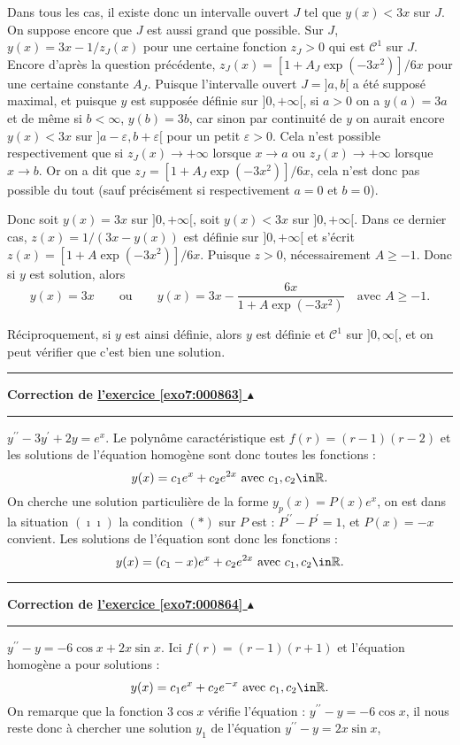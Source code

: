 \documentclass[11pt,a4paper]{article}
\renewcommand{\epsilon}{\varepsilon}
\newcounter{exo}
\newcommand{\correction}[1]{\hypertarget{cor7:#1}{}\label{cor7:#1}{\bf Correction de \hyperlink{exo7:#1}{l'exercice \ref{exo7:#1} $\blacktriangle$}}\vspace{1mm}\hrule\vspace{1mm}}
\newcommand{\fincorrection}{\vspace{1mm}\hrule\vspace*{7mm}}
\begin{document}
\begin{enumerate}
  Dans tous les cas, il existe donc un intervalle ouvert $J$ tel que $y(x) < 3x$ sur $J$. On suppose encore que $J$ est aussi grand que possible. Sur $J$, $y(x) = 3x - 1/{z_J(x)}$ pour une certaine fonction $z_J > 0$ qui est $\mathcal{C}^1$ sur $J$. Encore d'après la question précédente, $z_J(x) = [1+A_J\exp(-3x^2)]/6x$ pour une certaine constante $A_J$.
 Puisque l'intervalle ouvert $J = ]a,b[$ a été supposé maximal, et puisque $y$ est supposée définie sur $]0,+\infty[$, si $a > 0$ on a $y(a) = 3a$ et de même si $b < \infty$, $y(b) = 3b$, car sinon par continuité de $y$ on aurait encore $y(x) < 3x$ sur $]a-\epsilon,b+\epsilon[$ pour un petit $\epsilon > 0$. Cela n'est possible respectivement que si $z_J(x) \rightarrow +\infty$ lorsque $x \rightarrow a$ ou $z_J(x) \rightarrow +\infty$ lorsque $x \rightarrow b$. Or on a dit que $z_J = [1+A_J\exp(-3x^2)]/6x$, cela n'est donc pas possible du tout (sauf précisément si respectivement $a =0$ et $b=0$).
  
  Donc soit $y(x) = 3x$ sur $]0,+\infty[$, soit $y(x) < 3x$ sur $]0,+\infty[$. Dans ce dernier cas, $z(x) = 1/(3x-y(x))$ est définie sur $]0,+\infty[$ et s'écrit $z(x) = [1+A\exp(-3x^2)]/6x$. Puisque $z > 0$, nécessairement $A \geq -1$. Donc si $y$ est solution, alors     
    \[ y(x) = 3x \qquad \text{ou} \qquad y(x) =  3x - \frac{6x}{1+A\exp(-3x^2)} \quad \text{avec } A \geq -1.\]
    
 Réciproquement, si $y$ est ainsi définie, alors $y$ est définie et $\mathcal{C}^1$ sur $]0,\infty[$, et on peut vérifier que c'est bien une solution.
\end{enumerate}
\fincorrection
\correction{000863}
 $ y^{\prime\prime}- 3y^\prime + 2 y = e^x $. Le polyn\^ome caract\'eristique est
$f(r)= (r-1)(r-2)$ et les solutions de l'\'equation homog\`ene
sont donc toutes les fonctions :
$$ y(x) = c_1 e^x +c_2e^{2x}  \hbox{ avec } c_1, c_2 \in \R. $$
On cherche une solution particuli\`ere de la forme $y_p(x)=
P(x)e^x$, on est dans la situation $(\imath\imath)$ la condition
$(*)$ sur $P$ est : $P^{\prime\prime} -P^\prime = 1$, et $P(x)=-x$
convient. Les solutions de l'\'equation sont donc les fonctions :
$$ y(x) = (c_1-x)e^x +c_2e^{2x} \hbox{ avec } c_1, c_2 \in \R. $$
\fincorrection
\correction{000864}
 $ y^{\prime\prime}- y =-6\cos x + 2x\sin x $. Ici $f(r) =(r-1)(r+1)$ et l'\'equation
homog\`ene a pour solutions :
$$ y(x) = c_1 e^x +c_2e^{-x}  \hbox{ avec } c_1, c_2 \in \R .$$
On remarque que la fonction $3\cos x$ v\'erifie l'\'equation :
$y^{\prime\prime}- y =-6\cos x $, il nous reste donc \`a chercher
une solution $y_1$ de l'\'equation $y^{\prime\prime}-y=2x\sin x$,
\end{document}
